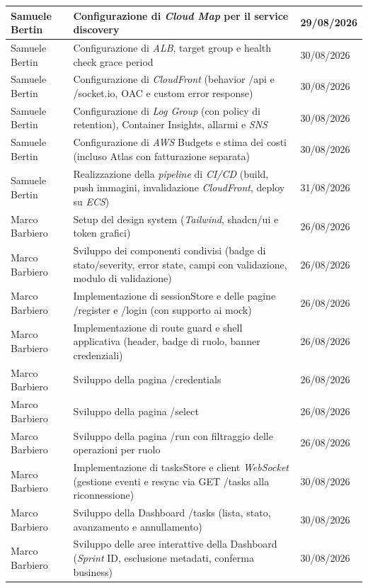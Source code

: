 \documentclass[12pt, a4paper]{article}
\begin{document}
\begin{xltabular}{\textwidth}{|l|X|l|}
    Samuele Bertin & Configurazione di \textit{Cloud Map} per il service discovery & 29/08/2026 \\ \hline
    Samuele Bertin & Configurazione di \textit{ALB}, target group e health check grace period & 30/08/2026 \\ \hline
    Samuele Bertin & Configurazione di \textit{CloudFront} (behavior /api e /socket.io, OAC e custom error response) & 30/08/2026 \\ \hline
    Samuele Bertin & Configurazione di \textit{Log Group} (con policy di retention), Container Insights, allarmi e \textit{SNS} & 30/08/2026 \\ \hline
    Samuele Bertin & Configurazione di \textit{AWS} Budgets e stima dei costi (incluso Atlas con fatturazione separata) & 30/08/2026 \\ \hline
    Samuele Bertin & Realizzazione della \textit{pipeline} di \textit{CI/CD} (build, push immagini, invalidazione \textit{CloudFront}, deploy su \textit{ECS}) & 31/08/2026 \\ \hline
    Marco Barbiero & Setup del design system (\textit{Tailwind}, shadcn/ui e token grafici) & 26/08/2026 \\ \hline
    Marco Barbiero & Sviluppo dei componenti condivisi (badge di stato/severity, error state, campi con validazione, modulo di validazione) & 26/08/2026 \\ \hline
    Marco Barbiero & Implementazione di sessionStore e delle pagine /register e /login (con supporto ai mock) & 26/08/2026 \\ \hline
    Marco Barbiero & Implementazione di route guard e shell applicativa (header, badge di ruolo, banner credenziali) & 26/08/2026 \\ \hline
    Marco Barbiero & Sviluppo della pagina /credentials & 26/08/2026 \\ \hline
    Marco Barbiero & Sviluppo della pagina /select & 26/08/2026 \\ \hline
    Marco Barbiero & Sviluppo della pagina /run con filtraggio delle operazioni per ruolo & 26/08/2026 \\ \hline
    Marco Barbiero & Implementazione di tasksStore e client \textit{WebSocket} (gestione eventi e resync via GET /tasks alla riconnessione) & 30/08/2026 \\ \hline
    Marco Barbiero & Sviluppo della Dashboard /tasks (lista, stato, avanzamento e annullamento) & 30/08/2026 \\ \hline
    Marco Barbiero & Sviluppo delle aree interattive della Dashboard (\textit{Sprint} ID, esclusione metadati, conferma business) & 30/08/2026 \\ \hline

\end{xltabular}
\end{document}
